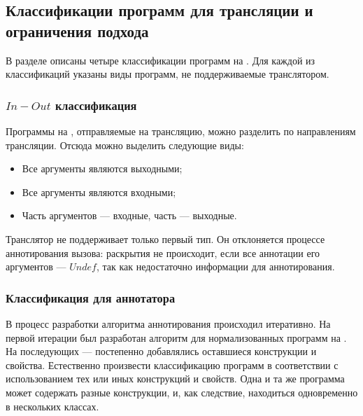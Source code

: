 \subsection{Классификации программ для трансляции и ограничения подхода}

В разделе описаны четыре классификации программ на \miniKanren{}.
Для каждой из классификаций указаны виды программ, не поддерживаемые транслятором.


\subsubsection{$In-Out$ классификация}

Программы на \miniKanren{}, отправляемые на трансляцию, можно разделить по направлениям трансляции.
Отсюда можно выделить следующие виды:
\begin{itemize}
    \item Все аргументы являются выходными;
    \item Все аргументы являются входными;
    \item Часть аргументов --- входные, часть --- выходные.
\end{itemize}

Транслятор не поддерживает только первый тип.
Он отклоняется процессе аннотирования вызова: раскрытия не происходит, если все аннотации его аргументов --- $Undef$, так как недостаточно информации для аннотирования.


\subsubsection{Классификация для аннотатора}

В процесс разработки алгоритма аннотирования происходил итеративно.
На первой итерации был разработан алгоритм для нормализованных программ на \miniKanren{}.
На последующих --- постепенно добавлялись оставшиеся конструкции \miniKanren{} и свойства.
Естественно произвести классификацию программ в соответствии с использованием тех или иных конструкций и свойств.
Одна и та же программа может содержать разные конструкции, и, как следствие, находиться одновременно в нескольких классах.

